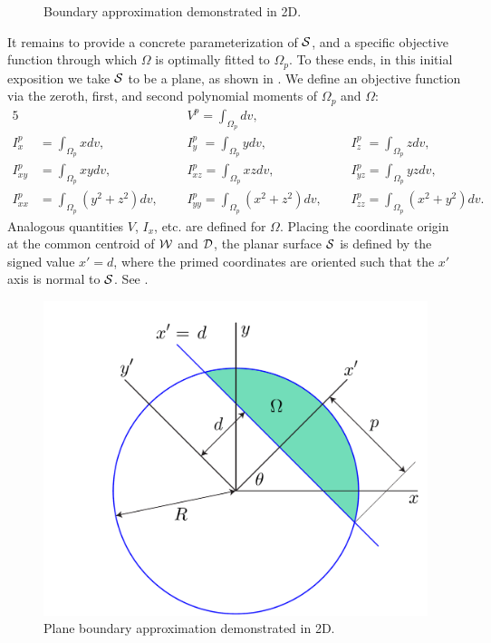 \begin{figure}[b!]
{		\label{fig:subfigure6}}
	
	\caption{Boundary approximation demonstrated in 2D.}
	\label{fig:figure3}
\end{figure}\noindent
It remains to provide a concrete parameterization of $\mathcal{S}$, and a specific objective function through which $\Omega$ is optimally fitted to $\Omega_p$.  To these ends, in this initial exposition we take $\mathcal{S}$ to be a plane, as shown in . We define an objective function via the zeroth, first, and second polynomial moments of $\Omega_p$ and $\Omega$: 
\begin{alignat}{5}
&{} &&V^p = \int_{\Omega_p}dv, &&{} \\
I_{x\phantom{z}}^p &= \int_{\Omega_p}xdv, &&I_{y\phantom{z}}^p = \int_{\Omega_p}ydv, &&I_{z\phantom{z}}^p = \int_{\Omega_p}zdv, \\
I^p_{xy} &= \int_{\Omega_p}xydv, &&I^p_{xz} = \int_{\Omega_p}xzdv, &&I^p_{yz} = \int_{\Omega_p}yzdv, \\
I^p_{xx} &= \int_{\Omega_p}(y^2 + z^2)dv, \text{\ \ \ \ \ \ }&&I^p_{yy} = \int_{\Omega_p}(x^2 + z^2)dv, \text{\ \ \ \ \ \ }&&I^p_{zz} = \int_{\Omega_p}(x^2 + y^2)dv.
\end{alignat}
Analogous quantities $V$, $I_x$, etc. are defined for $\Omega$.  Placing the coordinate origin at the common centroid of $\mathcal{W}$ and $\mathcal{D}$, the planar surface $\mathcal{S}$ is defined by the signed value $x' = d$, where the primed coordinates are oriented such that the $x'$ axis is normal to $\mathcal{S}$.  See .
\begin{figure}[t!]
	\centering
		\includegraphics[scale=0.3]{media/om/window.pdf}
	\caption{Plane boundary approximation demonstrated in 2D.}
	\label{fig:quad}
\end{figure}\noindent

